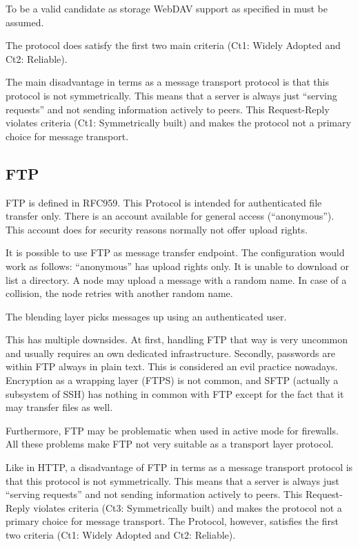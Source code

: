 \documentclass[a4paper,appendixprefix,pdfusetitle,twocolumn,fontsize=8pt,draft,DIV=calc]{scrbook}
\begin{document}
To be a valid candidate as storage WebDAV support as specified in \cite{rfc4918} must be assumed.

The protocol does satisfy the first two main criteria (Ct1: Widely Adopted and Ct2: Reliable).

The main disadvantage in terms as a message transport protocol is that this protocol is not symmetrically. This means that a server is always just ``serving requests'' and not sending information actively to peers. This Request-Reply violates criteria (Ct1: Symmetrically built) and makes the protocol not a primary choice for message transport. 

\subsection{FTP}
FTP is defined in RFC959\cite{RFC959}. This Protocol is intended for authenticated file transfer only. There is an account available for general access (``anonymous''). This account does for security reasons normally not offer upload rights.

It is possible to use FTP as message transfer endpoint. The configuration would work as follows: ``anonymous'' has upload rights only. It is unable to download or list a directory. A node may upload a message with a random name. In case of a collision, the node retries with another random name.

The blending layer picks messages up using an authenticated user.

This has multiple downsides. At first, handling FTP that way is very uncommon and usually requires an own dedicated infrastructure. Secondly, passwords are within FTP always in plain text. This is considered an evil practice nowadays. Encryption as a wrapping layer (FTPS) is not common, and SFTP (actually a subsystem of SSH) has nothing in common with FTP except for the fact that it may transfer files as well.

Furthermore, FTP may be problematic when used in active mode for firewalls. All these problems make FTP not very suitable as a transport layer protocol.

Like in HTTP, a disadvantage of FTP in terms as a message transport protocol is that this protocol is not symmetrically. This means that a server is always just ``serving requests'' and not sending information actively to peers. This Request-Reply violates criteria (Ct3: Symmetrically built) and makes the protocol not a primary choice for message transport. The Protocol, however, satisfies the first two criteria  (Ct1: Widely Adopted and Ct2: Reliable).
\end{document}
